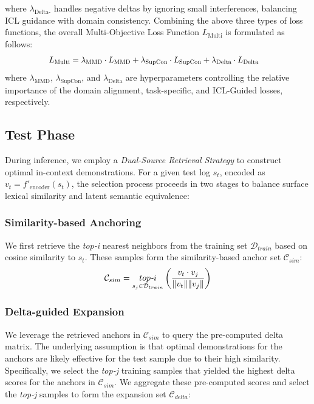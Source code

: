 \documentclass[lettersize,journal]{IEEEtran}
\begin{document}
where $\lambda_{\text{Delta-}}$ handles negative deltas by ignoring small interferences, balancing ICL guidance with domain consistency. Combining the above three types of loss functions, the overall Multi-Objective Loss Function $L_{\text{Multi}}$ is formulated as follows:
\begin{equation}
\label{eq:total_loss}
\scalebox{0.95}{$
\begin{aligned}
L_{\text{Multi}} &= \lambda_{\text{MMD}} \cdot L_{\text{MMD}} 
+ \lambda_{\text{SupCon}} \cdot L_{\text{SupCon}} 
+ \lambda_{\text{Delta}} \cdot L_{\text{Delta}}
\end{aligned}
$}
\end{equation}
where $\lambda_{\text{MMD}}$, $\lambda_{\text{SupCon}}$, and $\lambda_{\text{Delta}}$ are hyperparameters controlling the relative importance of the domain alignment, task-specific, and ICL-Guided losses, respectively.

\subsection{Test Phase}

During inference, we employ a \textit{Dual-Source Retrieval Strategy} to construct optimal in-context demonstrations. For a given test log $s_t$, encoded as \( v_t = f'_{\text{encoder}}(s_t) \), the selection process proceeds in two stages to balance surface lexical similarity and latent semantic equivalence:

\subsubsection{Similarity-based Anchoring}
We first retrieve the \textit{top-i} nearest neighbors from the training set $\mathcal{D}_{train}$ based on cosine similarity to $s_t$. These samples form the similarity-based anchor set $\mathcal{C}_{sim}$:
\begin{equation}
\label{eq:anchor_sim}
\setlength{\abovedisplayskip}{3pt}
\setlength{\belowdisplayskip}{3pt}
\mathcal{C}_{sim} = \mathop{top\textit{-}i}_{s_j \in \mathcal{D}_{train}} \left( \frac{v_t \cdot v_j}{\|v_t\| \|v_j\|} \right)
\end{equation}

\subsubsection{Delta-guided Expansion}
We leverage the retrieved anchors in $\mathcal{C}_{sim}$ to query the pre-computed delta matrix. The underlying assumption is that optimal demonstrations for the anchors are likely effective for the test sample due to their high similarity. Specifically, we select the \textit{top-j} training samples that yielded the highest delta scores for the anchors in $\mathcal{C}_{sim}$. We aggregate these pre-computed scores and select the \textit{top-j} samples to form the expansion set $\mathcal{C}_{delta}$:
\end{document}
